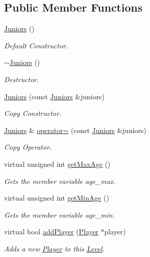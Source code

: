 \subsection*{Public Member Functions}
\begin{DoxyCompactItemize}
\item 
\hyperlink{class_juniors_a36519a818f54755dfd1bd14e15b4fcea}{Juniors} ()
\begin{DoxyCompactList}\small\item\em Default Constructor. \end{DoxyCompactList}\item 
\hyperlink{class_juniors_ae9087dae0157d9a4539f5fc7e68e7478}{$\sim$\+Juniors} ()
\begin{DoxyCompactList}\small\item\em Destructor. \end{DoxyCompactList}\item 
\hyperlink{class_juniors_ab9b00b26e59661ee5aee18a3a6beb53c}{Juniors} (const \hyperlink{class_juniors}{Juniors} \&juniors)
\begin{DoxyCompactList}\small\item\em Copy Constructor. \end{DoxyCompactList}\item 
\hyperlink{class_juniors}{Juniors} \& \hyperlink{class_juniors_adf648456072b60a7f99973c764c01c85}{operator=} (const \hyperlink{class_juniors}{Juniors} \&juniors)
\begin{DoxyCompactList}\small\item\em Copy Operator. \end{DoxyCompactList}\item 
virtual unsigned int \hyperlink{class_juniors_a98c28047a2d5ff2b14651ee9eccfd2b6}{get\+Max\+Age} ()
\begin{DoxyCompactList}\small\item\em Gets the member variable age\+\_\+max. \end{DoxyCompactList}\item 
virtual unsigned int \hyperlink{class_juniors_a3110bdbaa344b2bfefa2ddcb8be8d7c6}{get\+Min\+Age} ()
\begin{DoxyCompactList}\small\item\em Gets the member variable age\+\_\+min. \end{DoxyCompactList}\item 
virtual bool \hyperlink{class_juniors_a23915dab5b0c30a978f08a653483db53}{add\+Player} (\hyperlink{class_player}{Player} $\ast$player)
\begin{DoxyCompactList}\small\item\em Adds a new \hyperlink{class_player}{Player} to this \hyperlink{class_level}{Level}. \end{DoxyCompactList}\item 

\end{DoxyCompactItemize}
